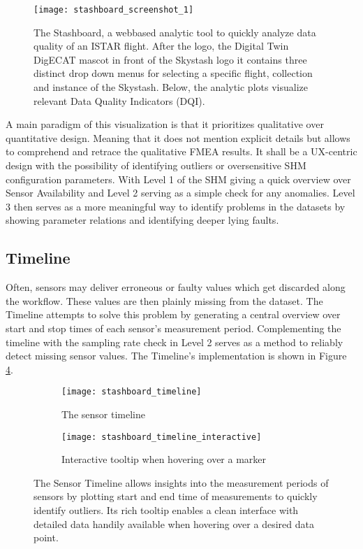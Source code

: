 \begin{figure}[!h]
    \centering
    \texttt{[image: stashboard\_screenshot\_1]}
    \caption[Visualization: Stashboard Screenshot]{The Stashboard, a webbased analytic tool to quickly analyze data quality of an ISTAR flight. After the logo, the Digital Twin DigECAT mascot in front of the Skystash logo it contains three distinct drop down menus for selecting a specific flight, collection and instance of the Skystash. Below, the analytic plots visualize relevant Data Quality Indicators (DQI).}
    \label{fig:stashboard}
\end{figure}
A main paradigm of this visualization is that it prioritizes qualitative over quantitative design. Meaning that it does not mention explicit details but allows to comprehend and retrace the qualitative FMEA results. It shall be a UX-centric design with the possibility of identifying outliers or oversensitive SHM configuration parameters. With Level 1 of the SHM giving a quick overview over Sensor Availability and Level 2 serving as a simple check for any anomalies. Level 3 then serves as a more meaningful way to identify problems in the datasets by showing parameter relations and identifying deeper lying faults.

\subsection{Timeline}

Often, sensors may deliver erroneous or faulty values which get discarded along the workflow. These values are then plainly missing from the dataset. The Timeline attempts to solve this problem by generating a central overview over start and stop times of each sensor's measurement period. Complementing the timeline with the sampling rate check in Level 2 serves as a method to reliably detect missing sensor values. The Timeline's implementation is shown in Figure \ref{fig:stashboard_timeline}.

\begin{figure}[!h]
    \centering
    \begin{subfigure}[b]{1\textwidth}
        \texttt{[image: stashboard\_timeline]}
        \caption{The sensor timeline}
        \label{fig:stashboard_timeline_clean}
    \end{subfigure}
    \begin{subfigure}[b]{1\textwidth}
        \texttt{[image: stashboard\_timeline\_interactive]}
        \caption{Interactive tooltip when hovering over a marker}
        \label{fig:stashboard_timeline_interactive}
    \end{subfigure}
    \caption[Stashboard: Sensor Timeline]{The Sensor Timeline allows insights into the measurement periods of sensors by plotting start and end time of measurements to quickly identify outliers. Its rich tooltip enables a clean interface with detailed data handily available when hovering over a desired data point.}
    \label{fig:stashboard_timeline}
\end{figure}

